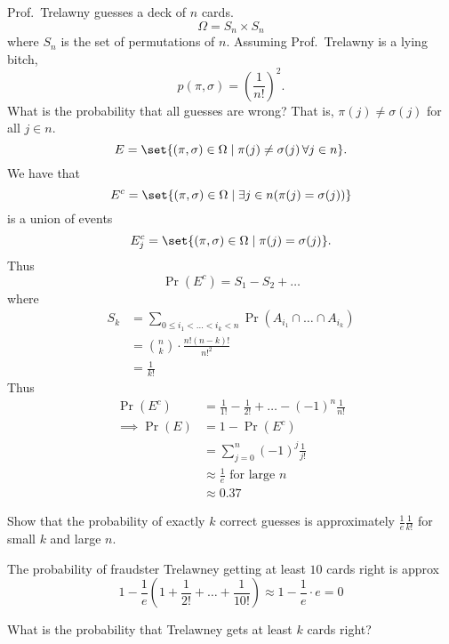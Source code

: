 \begin{example}
    Prof.~Trelawny guesses a deck of $n$ cards. \[
        \Omega = S_{n} \times S_{n}
    \] where $S_{n}$ is the set of permutations of $n$.
    Assuming Prof.~Trelawny is a lying bitch, \[
        p(\pi, \sigma) = \left(\frac{1}{n!}\right)^{2}.
    \] What is the probability that all guesses are wrong?
    That is, $\pi(j) \neq \sigma(j)$ for all $j \in n$. \[
        E = \set{(\pi, \sigma) \in \Omega \mid \pi(j) \neq \sigma(j)
        \,\forall j \in n}.
    \] We have that \[
        E^{c} = \set{(\pi, \sigma) \in \Omega \mid \exists j \in n (
            \pi(j) = \sigma(j))}
    \] is a union of events \[
        E^c_j = \set{(\pi, \sigma) \in \Omega \mid \pi(j) = \sigma(j)}.
    \] Thus \[
        \Pr(E^c) = S_1 - S_2 + \dots
    \] where \begin{align*}
        S_k &= \sum_{0 \leq i_1 < \dots < i_k < n}
            \Pr(A_{i_1} \cap \dots \cap A_{i_k}) \\
            &= \binom{n}{k} \cdot \frac{n! (n - k)!}{n!^2} \\
            &= \frac{1}{k!}
    \end{align*}
    Thus \begin{align*}
        \Pr(E^c) &= \frac{1}{1!} - \frac{1}{2!} + \dots - (-1)^{n} \frac{1}{n!} \\
        \implies \Pr(E) &= 1 - \Pr(E^c) \\
            &= \sum_{j = 0}^{n} (-1)^{j} \frac{1}{j!} \\
            &\approx \frac{1}{e} \text{ for large } n \\
            &\approx 0.37
    \end{align*}
\end{example}
\begin{problem}
    Show that the probability of exactly $k$ correct guesses is
    approximately $\frac{1}{e} \frac{1}{k!}$ for small $k$ and large $n$.
\end{problem}
\begin{example}
    The probability of fraudster Trelawney getting at least $10$ cards right is
    approx \[
        1 - \frac{1}{e} \left(1 + \frac{1}{2!} + \dots + \frac{1}{10!}\right)
        \approx 1 - \frac{1}{e} \cdot e = 0
    \]
\end{example}
\begin{problem}
    What is the probability that Trelawney gets at least $k$ cards right?
\end{problem}

